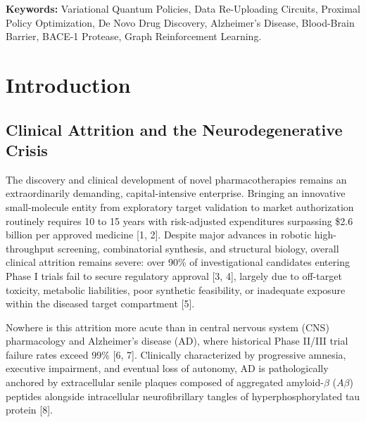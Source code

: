 \documentclass[10pt,a4paper]{article}
\begin{document}
\begin{abstract}
\noindent\textbf{Results:} MolGAN-VQP completely resolves mode collapse, achieving 100.0\% chemical validity, 100.0\% uniqueness, and 100.0\% novelty across benchmark campaigns. Strain-free chemical cleanliness increases from 43.0\%--54.0\% to 99.0\% (100.0\% at Epoch 50), while stable 5/6-membered ring yield rises from 8.0\% to 90.0\%. Multi-target screening yields 16 Tier-1 lead candidates combining verified blood-brain barrier permeation with predicted nanomolar BACE-1 inhibition.

\noindent\textbf{Conclusion:} These results demonstrate that combining variational quantum policy gradients with deterministic chemical masking provides a robust, physically grounded methodology for target-specific central nervous system drug discovery.
\end{abstract}

\vspace{0.18cm}
\noindent\textbf{Keywords:} Variational Quantum Policies, Data Re-Uploading Circuits, Proximal Policy Optimization, De Novo Drug Discovery, Alzheimer's Disease, Blood-Brain Barrier, BACE-1 Protease, Graph Reinforcement Learning.

\vspace{0.35cm}
\section{Introduction}

\subsection{Clinical Attrition and the Neurodegenerative Crisis}
The discovery and clinical development of novel pharmacotherapies remains an extraordinarily demanding, capital-intensive enterprise. Bringing an innovative small-molecule entity from exploratory target validation to market authorization routinely requires 10 to 15 years with risk-adjusted expenditures surpassing \$2.6 billion per approved medicine [1, 2]. Despite major advances in robotic high-throughput screening, combinatorial synthesis, and structural biology, overall clinical attrition remains severe: over 90\% of investigational candidates entering Phase I trials fail to secure regulatory approval [3, 4], largely due to off-target toxicity, metabolic liabilities, poor synthetic feasibility, or inadequate exposure within the diseased target compartment [5].

Nowhere is this attrition more acute than in central nervous system (CNS) pharmacology and Alzheimer's disease (AD), where historical Phase II/III trial failure rates exceed 99\% [6, 7]. Clinically characterized by progressive amnesia, executive impairment, and eventual loss of autonomy, AD is pathologically anchored by extracellular senile plaques composed of aggregated amyloid-$\beta$ ($A\beta$) peptides alongside intracellular neurofibrillary tangles of hyperphosphorylated tau protein [8].
\end{document}
